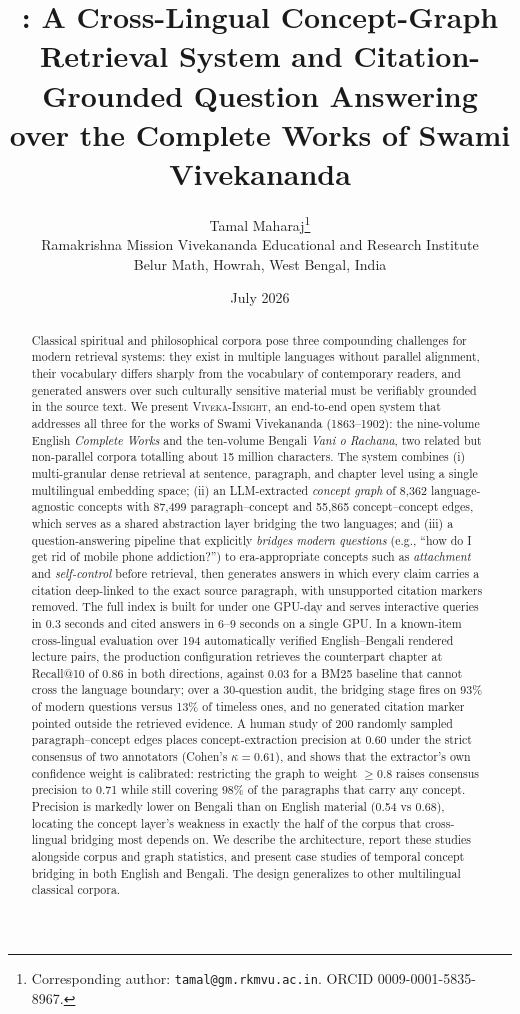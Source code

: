 \documentclass[11pt,a4paper]{article}
\title{\system{}: A Cross-Lingual Concept-Graph Retrieval System and
Citation-Grounded Question Answering over the Complete Works of
Swami Vivekananda}
\author{%
  Tamal Maharaj\thanks{Corresponding author: \texttt{tamal@gm.rkmvu.ac.in}.
  ORCID 0009-0001-5835-8967.}\\
  \small Ramakrishna Mission Vivekananda Educational and Research Institute\\
  \small Belur Math, Howrah, West Bengal, India
}
\date{July 2026}
\newcommand{\system}{\textsc{Viveka-Insight}}
\begin{document}
\maketitle

\begin{abstract}
Classical spiritual and philosophical corpora pose three compounding
challenges for modern retrieval systems: they exist in multiple languages
without parallel alignment, their vocabulary differs sharply from the
vocabulary of contemporary readers, and generated answers over such
culturally sensitive material must be verifiably grounded in the source
text. We present \system{}, an end-to-end open system that addresses all
three for the works of Swami Vivekananda (1863--1902): the nine-volume
English \emph{Complete Works} and the ten-volume Bengali
\emph{Vani o Rachana}, two related but non-parallel corpora totalling
about 15 million characters. The system combines (i) multi-granular dense
retrieval at sentence, paragraph, and chapter level using a single
multilingual embedding space; (ii) an LLM-extracted \emph{concept graph}
of 8{,}362 language-agnostic concepts with 87{,}499 paragraph--concept and
55{,}865 concept--concept edges, which serves as a shared abstraction
layer bridging the two languages; and (iii) a question-answering pipeline
that explicitly \emph{bridges modern questions} (e.g., ``how do I get rid
of mobile phone addiction?'') to era-appropriate concepts such as
\emph{attachment} and \emph{self-control} before retrieval, then generates
answers in which every claim carries a citation deep-linked to the exact
source paragraph, with unsupported citation markers removed. The full index is
built for under one GPU-day and serves interactive queries in 0.3 seconds
and cited answers in 6--9 seconds on a single GPU. In a known-item
cross-lingual evaluation over 194 automatically verified
English--Bengali rendered lecture pairs, the production configuration
retrieves the counterpart chapter at Recall@10 of 0.86 in both directions,
against 0.03 for a BM25 baseline that cannot cross the language boundary; over a 30-question audit, the bridging stage fires on 93\% of
modern questions versus 13\% of timeless ones, and no generated citation
marker pointed outside the retrieved evidence. A human study of 200
randomly sampled paragraph--concept edges places concept-extraction
precision at 0.60 under the strict consensus of two annotators
(Cohen's $\kappa = 0.61$), and shows that the extractor's own confidence
weight is calibrated: restricting the graph to weight $\geq 0.8$ raises
consensus precision to 0.71 while still covering 98\% of the paragraphs
that carry any concept. Precision is markedly lower on Bengali than on
English material (0.54 vs 0.68), locating the concept layer's weakness
in exactly the half of the corpus that cross-lingual bridging most
depends on. We describe the
architecture, report these studies alongside corpus and graph statistics,
and present case studies of temporal concept bridging in both English and
Bengali. The design generalizes to other multilingual classical corpora.
\end{abstract}
\end{document}
